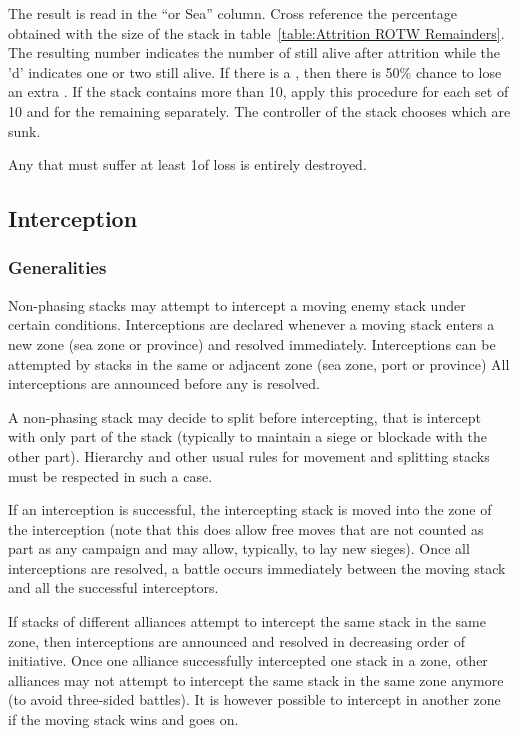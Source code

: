 The result is read in the ``\ROTW or Sea'' column. Cross reference the
percentage obtained with the size of the stack in table~\ref{table:Attrition
  ROTW Remainders}. The resulting number indicates the number of \ND still
alive after attrition while the 'd' indicates one or two \NDE still alive. If
there is a \textetoile, then there is 50\% chance to lose an extra \NDE. If
the stack contains more than 10\ND, apply this procedure for each set of 10\ND
and for the remaining \ND separately. The controller of the stack chooses
which \ND are sunk.

Any \NTD that must suffer at least 1\NDE of loss is entirely destroyed.

\subsection{Interception}
\subsubsection{Generalities}
Non-phasing stacks may attempt to intercept a moving enemy stack under certain
conditions. Interceptions are declared whenever a moving stack enters a new
zone (sea zone or province) and resolved immediately. Interceptions can be
attempted by stacks in the same or adjacent zone (sea zone, port or province)
All interceptions are announced before any is resolved.

A non-phasing stack may decide to split before intercepting, that is intercept
with only part of the stack (typically to maintain a siege or blockade with
the other part). Hierarchy and other usual rules for movement and splitting
stacks must be respected in such a case.

If an interception is successful, the intercepting stack is moved into the
zone of the interception (note that this does allow free moves that are not
counted as part as any campaign and may allow, typically, to lay new
sieges). Once all interceptions are resolved, a battle occurs immediately
between the moving stack and all the successful interceptors.

If stacks of different alliances attempt to intercept the same stack in the
same zone, then interceptions are announced and resolved in decreasing order
of initiative. Once one alliance successfully intercepted one stack in a zone,
other alliances may not attempt to intercept the same stack in the same zone
anymore (to avoid three-sided battles). It is however possible to intercept in
another zone if the moving stack wins and goes on.

